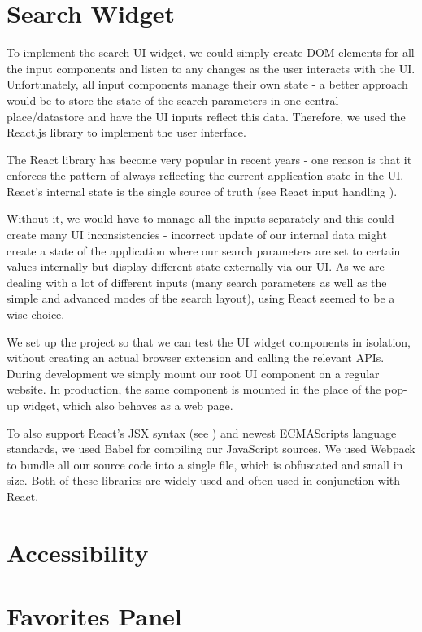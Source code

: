 \documentclass[bsc,frontabs,twoside,singlespacing,parskip,deptreport]{infthesis}
\begin{document}
\section{Search Widget}
To implement the search UI widget, we could simply create DOM elements for all the input components and listen to any changes as the user interacts with the UI. Unfortunately, all input components manage their own state - a better approach would be to store the state of the search parameters in one central place/datastore and have the UI inputs reflect this data. Therefore, we used the React.js library to implement the user interface.

The React library \cite{A3} has become very popular in recent years - one reason is that it enforces the pattern of always reflecting the current application state in the UI. React's internal state is the single source of truth (see React input handling \cite{A4}).

Without it, we would have to manage all the inputs separately and this could create many UI inconsistencies - incorrect update of our internal data might create a state of the application where our search parameters are set to certain values internally but display different state externally via our UI. As we are dealing with a lot of different inputs (many search parameters as well as the simple and advanced modes of the search layout), using React seemed to be a wise choice.

We set up the project so that we can test the UI widget components in isolation, without creating an actual browser extension and calling the relevant APIs. During development we simply mount our root UI component on a regular website. In production, the same component is mounted in the place of the pop-up widget, which also behaves as a web page.

To also support React's JSX syntax (see \cite{A5}) and newest ECMAScripts language standards, we used Babel \cite{A6} for compiling our JavaScript sources. We used Webpack \cite{A7} to bundle all our source code into a single file, which is obfuscated and small in size. Both of these libraries are widely used and often used in conjunction with React.


\section{Accessibility}

\section{Favorites Panel}
\end{document}
